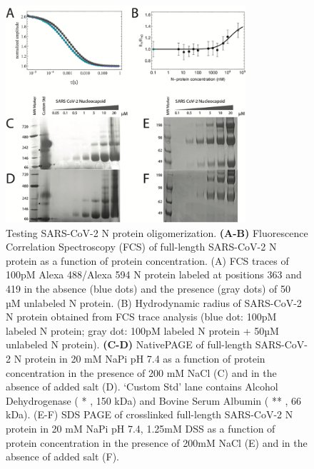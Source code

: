 \documentclass[../main.tex]{subfiles}
\begin{document}
        \begin{figure}[!htb] %
            \centering
            \includegraphics[width=3.5in]{appendix-e-fig13.png}
            \caption[Testing SARS-CoV-2 N protein oligomerization.]
                {Testing SARS-CoV-2 N protein oligomerization. \textbf{(A-B)} Fluorescence Correlation Spectroscopy (FCS) of full-length SARS-CoV-2 N protein as a function of protein concentration. (A) FCS traces of 100pM Alexa 488/Alexa 594 N protein labeled at positions 363 and 419 in the absence (blue dots) and the presence (gray dots) of 50 µM unlabeled N protein. (B) Hydrodynamic radius of SARS-CoV-2 N protein obtained from FCS trace analysis (blue dot: 100pM labeled N protein; gray dot: 100pM labeled N protein + 50µM unlabeled N protein). \textbf{(C-D)} NativePAGE of full-length SARS-CoV-2 N protein in 20 mM NaPi pH 7.4 as a function of protein concentration in the presence of 200 mM NaCl (C) and in the absence of added salt (D). ‘Custom Std’ lane contains Alcohol Dehydrogenase ( * , 150 kDa) and Bovine Serum Albumin ( ** , 66 kDa). (E-F) SDS PAGE of crosslinked full-length SARS-CoV-2 N protein in 20 mM NaPi pH 7.4, 1.25mM DSS as a function of protein concentration in the presence of 200mM NaCl (E) and in the absence of added salt (F).  }
            \label{fig:appendix-e-fig13}
        \end{figure}
\end{document}
